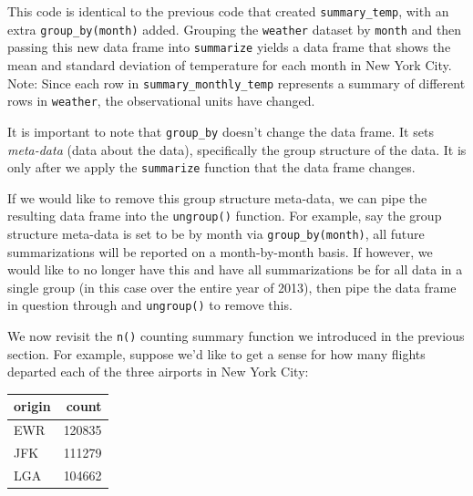 \documentclass[12pt,]{krantz}
\makeatletter
\newenvironment{Shaded}{\begin{snugshade}}{\end{snugshade}}
\newcommand{\KeywordTok}[1]{\textcolor[rgb]{0.27,0.27,0.27}{\textbf{#1}}}
\newcommand{\DataTypeTok}[1]{\textcolor[rgb]{0.27,0.27,0.27}{#1}}
\newcommand{\StringTok}[1]{\textcolor[rgb]{0.5,0.5,0.5}{#1}}
\newcommand{\OperatorTok}[1]{\textcolor[rgb]{0.43,0.43,0.43}{\textbf{#1}}}
\newcommand{\NormalTok}[1]{#1}
\newenvironment{kframe}{%
\medskip{}
\setlength{\fboxsep}{.8em}
 \def\at@end@of@kframe{}%
 \ifinner\ifhmode%
  \def\at@end@of@kframe{\end{minipage}}%
  \begin{minipage}{\columnwidth}%
 \fi\fi%
 \def\FrameCommand##1{\hskip\@totalleftmargin \hskip-\fboxsep
 \colorbox{shadecolor}{##1}\hskip-\fboxsep
     \hskip-\linewidth \hskip-\@totalleftmargin \hskip\columnwidth}%
 \MakeFramed {\advance\hsize-\width
   \@totalleftmargin\z@ \linewidth\hsize
   \@setminipage}}%
 {\par\unskip\endMakeFramed%
 \at@end@of@kframe}
\renewenvironment{Shaded}{\begin{kframe}}{\end{kframe}}
\theoremstyle{definition}
\theoremstyle{definition}
\theoremstyle{definition}
\theoremstyle{remark}
\makeatother
\begin{document}
This code is identical to the previous code that created
\texttt{summary\_temp}, with an extra \texttt{group\_by(month)} added.
Grouping the \texttt{weather} dataset by \texttt{month} and then passing
this new data frame into \texttt{summarize} yields a data frame that
shows the mean and standard deviation of temperature for each month in
New York City. Note: Since each row in \texttt{summary\_monthly\_temp}
represents a summary of different rows in \texttt{weather}, the
observational units have changed.

It is important to note that \texttt{group\_by} doesn't change the data
frame. It sets \emph{meta-data} (data about the data), specifically the
group structure of the data. It is only after we apply the
\texttt{summarize} function that the data frame changes.

If we would like to remove this group structure meta-data, we can pipe
the resulting data frame into the \texttt{ungroup()} function. For
example, say the group structure meta-data is set to be by month via
\texttt{group\_by(month)}, all future summarizations will be reported on
a month-by-month basis. If however, we would like to no longer have this
and have all summarizations be for all data in a single group (in this
case over the entire year of 2013), then pipe the data frame in question
through and \texttt{ungroup()} to remove this.

We now revisit the \texttt{n()} counting summary function we introduced
in the previous section. For example, suppose we'd like to get a sense
for how many flights departed each of the three airports in New York
City:

\begin{Shaded}
\end{Shaded}

\begin{table}[H]
\centering\begingroup\fontsize{10}{12}\selectfont

\begin{tabular}{l|r}
\hline
origin & count\\
\hline
EWR & 120835\\
\hline
JFK & 111279\\
\hline
LGA & 104662\\
\hline
\end{tabular}\endgroup{}
\end{table}
\end{document}
